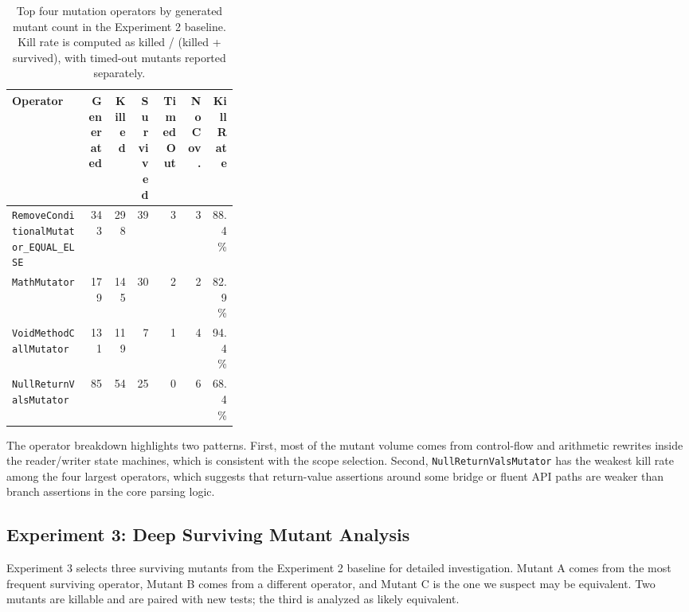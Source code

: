 \documentclass[11pt]{article}
\begin{document}
\begin{table}[H]
\centering
\footnotesize
\begin{tabularx}{\linewidth}{>{\raggedright\arraybackslash}p{0.33\linewidth}rrrrrr}
\toprule
Operator & Generated & Killed & Survived & Timed Out & No Cov. & Kill Rate \\
\midrule
\texttt{RemoveConditionalMutator\_EQUAL\_ELSE} & 343 & 298 & 39 & 3 & 3 & 88.4\% \\
\texttt{MathMutator} & 179 & 145 & 30 & 2 & 2 & 82.9\% \\
\texttt{VoidMethodCallMutator} & 131 & 119 & 7 & 1 & 4 & 94.4\% \\
\texttt{NullReturnValsMutator} & 85 & 54 & 25 & 0 & 6 & 68.4\% \\
\bottomrule
\end{tabularx}
\caption{Top four mutation operators by generated mutant count in the Experiment 2 baseline. Kill rate is computed as killed / (killed + survived), with timed-out mutants reported separately.}
\end{table}

The operator breakdown highlights two patterns. First, most of the mutant volume comes from control-flow and arithmetic rewrites inside the reader/writer state machines, which is consistent with the scope selection. Second, \texttt{NullReturnValsMutator} has the weakest kill rate among the four largest operators, which suggests that return-value assertions around some bridge or fluent API paths are weaker than branch assertions in the core parsing logic.

\subsection{Experiment 3: Deep Surviving Mutant Analysis}
Experiment 3 selects three surviving mutants from the Experiment 2 baseline for detailed investigation. Mutant A comes from the most frequent surviving operator, Mutant B comes from a different operator, and Mutant C is the one we suspect may be equivalent. Two mutants are killable and are paired with new tests; the third is analyzed as likely equivalent.
\end{document}
